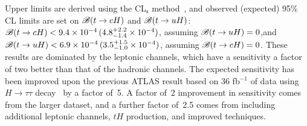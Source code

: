 Upper limits are derived using the CL$_{\textrm{s}}$ method~\cite{Junk:1999kv,Read:2002hq}, and  
observed (expected) 95\% CL limits are set on $\mathscr{B}(t\to cH)$ and $\mathscr{B}(t\to uH)$:
$\mathscr{B}(t\to cH)<9.4 \times 10^{-4}\,(4.8^{+2.2}_{-1.4}\times10^{-4})$, assuming $\mathscr{B}(t\to uH)=0$,and $\mathscr{B}(t\to uH)<6.9 \times 10^{-4}\,(3.5^{+1.5}_{-1.0}\times10^{-4})$, assuming $\mathscr{B}(t\to cH)=0$.
These results are dominated by the leptonic channels, which have a sensitivity a factor of two better than that of the hadronic channels.
The expected sensitivity has been improved upon the previous ATLAS result based on 36 fb$^{-1}$ of data using $H\to \tau\tau$ decay~\cite{fcnc36} by a factor of~5. A factor of~2 improvement in sensitivity comes from the larger dataset, and a further factor of~2.5 comes from including
additional leptonic channels, $tH$ production, and improved techniques.


